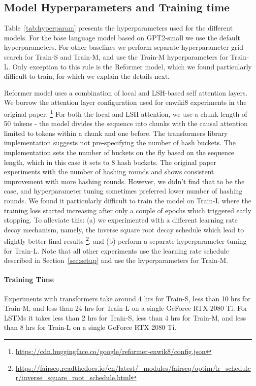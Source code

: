 \documentclass[12pt]{thesis-umich}[thesis]
\begin{document}
  




 \subsection{Model Hyperparameters and Training time}
\label{sec:hyperparams}
Table~\ref{tab:hyperparam} presents the hyperparameters used for the different models. For the base language model based on GPT2-small we use the default hyperparameters. For other baselines we perform separate hyperparameter grid search for Train-S and Train-M, and use the Train-M hyperparameters for Train-L. 
Only exception to this rule is the Reformer model, which we found particularly difficult to train, for which we explain the details next.

Reformer model uses a combination of local and LSH-based self attention layers. We borrow the attention layer configuration used for enwiki8 experiments in the original paper. \footnote{\url{https://cdn.huggingface.co/google/reformer-enwik8/config.json}} 
For both the local and LSH attention, we use a chunk length of 50 tokens - the model divides the sequence into chunks with the causal attention limited to tokens within a chunk and one before.
The transformers library implementation suggests not pre-specifying the number of hash buckets. The implementation sets the number of buckets on the fly based on the sequence length, which in this case it sets to 8 hash buckets. The original paper experiments with the number of hashing rounds and shows consistent improvement with more hashing rounds. However, we didn't find that to be the case, and hyperparameter tuning sometimes preferred lower number of hashing rounds. 
We found it particularly difficult to train the model on Train-L where the training loss started increasing after only a couple of epochs which triggered early stopping. To alleviate this: (a) we experimented with a different learning rate decay mechanism, namely, the inverse square root decay schedule which lead to slightly better final results  \footnote{\url{https://fairseq.readthedocs.io/en/latest/_modules/fairseq/optim/lr_scheduler/inverse_square_root_schedule.html}}, and (b) perform a separate hyperparameter tuning for Train-L.  
Note that all other experiments use the learning rate schedule described in Section~\ref{sec:setup} and use the hyperparameters for Train-M.  

\paragraph{Training Time}
Experiments with transformers take around 4 hrs for Train-S, less than 10 hrs for Train-M, and less than 24 hrs for Train-L on a single GeForce RTX 2080 Ti. For LSTMs it takes less than 2 hrs for Train-S, less than 4 hrs for Train-M, and less than 8 hrs for Train-L on a single GeForce RTX 2080 Ti.
\end{document}
